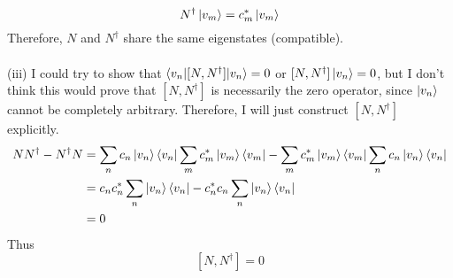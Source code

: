\documentclass[11pt,letterpaper]{article}
\begin{document}
\begin{enumerate}
\begin{enumerate}
$$N^\dag\ket{v_m} = c_m^*\ket{v_m}$$
Therefore, $N$ and $N^\dag$ share the same eigenstates (compatible).
\\ \\(iii) I could try to show that $\braket{v_n|[N,N^\dag]|v_n}=0$ or $[N,N^\dag]\ket{v_n}=0$, but I don't think this would prove that $[N,N^\dag]$ is necessarily the zero operator, since $\ket{v_n}$ cannot be completely arbitrary. Therefore, I will just construct $[N,N^\dag]$ explicitly.
\begin{align*} NN^\dag - N^\dag N &= \sum_{n}{c_n\ket{v_n}\bra{v_n}}\sum_{m}{c_m^*\ket{v_m}\bra{v_m}}-\sum_{m}{c_m^*\ket{v_m}\bra{v_m}}\sum_{n}{c_n\ket{v_n}\bra{v_n}}\\ &=c_nc_n^*\sum_n{\ket{v_n}\bra{v_n}}-c_n^*c_n\sum_n{\ket{v_n}\bra{v_n}}\\&=0
\end{align*}
Thus
$$[N,N^\dag] = 0$$
\end{enumerate}


\end{enumerate}
\end{document}
